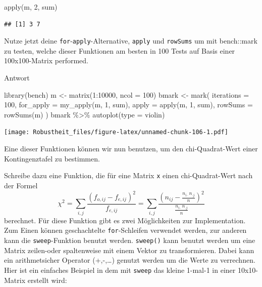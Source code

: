 \documentclass[
]{book}
\newenvironment{Shaded}{\begin{snugshade}}{\end{snugshade}}
\newcommand{\AttributeTok}[1]{\textcolor[rgb]{0.77,0.63,0.00}{#1}}
\newcommand{\DecValTok}[1]{\textcolor[rgb]{0.00,0.00,0.81}{#1}}
\newcommand{\FunctionTok}[1]{\textcolor[rgb]{0.00,0.00,0.00}{#1}}
\newcommand{\NormalTok}[1]{#1}
\newcommand{\OtherTok}[1]{\textcolor[rgb]{0.56,0.35,0.01}{#1}}
\newcommand{\SpecialCharTok}[1]{\textcolor[rgb]{0.00,0.00,0.00}{#1}}
\newcommand{\StringTok}[1]{\textcolor[rgb]{0.31,0.60,0.02}{#1}}
\begin{document}
\begin{Shaded}
\begin{Highlighting}[]
\FunctionTok{apply}\NormalTok{(m, }\DecValTok{2}\NormalTok{, sum)}
\end{Highlighting}
\end{Shaded}

\begin{verbatim}
## [1] 3 7
\end{verbatim}

Nutze jetzt deine \texttt{for}-\texttt{apply}-Alternative, \texttt{apply} und \texttt{rowSums} um mit bench::mark zu testen, welche dieser Funktionen am besten in 100 Tests auf Basis einer 100x100-Matrix performed.

Antwort

\begin{Shaded}
\begin{Highlighting}[]
\FunctionTok{library}\NormalTok{(bench)}
\NormalTok{m }\OtherTok{\textless{}{-}} \FunctionTok{matrix}\NormalTok{(}\DecValTok{1}\SpecialCharTok{:}\DecValTok{10000}\NormalTok{, }\AttributeTok{ncol =} \DecValTok{100}\NormalTok{)}
\NormalTok{bmark }\OtherTok{\textless{}{-}} \FunctionTok{mark}\NormalTok{(}
  \AttributeTok{iterations =} \DecValTok{100}\NormalTok{,}
  \AttributeTok{for\_apply =} \FunctionTok{my\_apply}\NormalTok{(m, }\DecValTok{1}\NormalTok{, sum),}
  \AttributeTok{apply =} \FunctionTok{apply}\NormalTok{(m, }\DecValTok{1}\NormalTok{, sum),}
  \AttributeTok{rowSums =} \FunctionTok{rowSums}\NormalTok{(m)}
\NormalTok{)}
\NormalTok{bmark }\SpecialCharTok{\%\textgreater{}\%} 
  \FunctionTok{autoplot}\NormalTok{(}\AttributeTok{type =} \StringTok{\textquotesingle{}violin\textquotesingle{}}\NormalTok{)}
\end{Highlighting}
\end{Shaded}

\texttt{[image: Robustheit\_files/figure-latex/unnamed-chunk-106-1.pdf]}

Eine dieser Funktionen können wir nun benutzen, um den chi-Quadrat-Wert einer Kontingenztafel zu bestimmen.

Schreibe dazu eine Funktion, die für eine Matrix \texttt{x} einen chi-Quadrat-Wert nach der Formel \[\chi^2=\sum_{i,j}\frac{(f_{o,ij}-f_{e,ij})^2}{f_{e,ij}} = \sum_{i,j}\frac{\left(n_{ij}- \frac{n_{i\cdot} n_{\cdot j}}{n}\right)^2}{\frac{n_{i\cdot} n_{\cdot j}}{n}}\] berechnet.
Für diese Funktion gibt es zwei Möglichkeiten zur Implementation. Zum Einen können geschachtelte \texttt{for}-Schleifen verwendet werden, zur anderen kann die \texttt{sweep}-Funktion benutzt werden.
\texttt{sweep()} kann benutzt werden um eine Matrix zeilen-oder spaltenweise mit einem Vektor zu transformieren. Dabei kann ein arithmetsicher Operator (+,-,\ldots) genutzt werden um die Werte zu verrechnen. Hier ist ein einfaches Beispiel in dem mit \texttt{sweep} das kleine 1-mal-1 in einer 10x10-Matrix erstellt wird:
\end{document}
